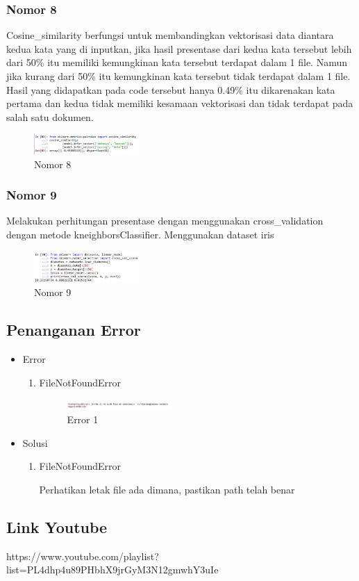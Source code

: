 \subsubsection{Nomor 8}
\hfill\break

Cosine\_similarity berfungsi untuk membandingkan vektorisasi data diantara kedua kata yang di inputkan, jika hasil presentase dari kedua kata tersebut lebih dari 50\% itu memiliki kemungkinan kata tersebut terdapat dalam 1 file. Namun jika kurang dari 50\% itu kemungkinan kata tersebut tidak terdapat dalam 1 file. Hasil yang didapatkan pada code tersebut hanya 0.49\% itu dikarenakan kata pertama dan kedua tidak memiliki kesamaan vektorisasi dan tidak terdapat pada salah satu dokumen.
\begin{figure}[H]
\includegraphics[width=4cm]{figures/1174067/5/hasil8.jpg}
\centering
\caption{Nomor 8}
\end{figure}

	
\subsubsection{Nomor 9}
\hfill\break

Melakukan perhitungan presentase dengan menggunakan cross\_validation dengan metode kneighborsClassifier. Menggunakan dataset iris
\begin{figure}[H]
\includegraphics[width=4cm]{figures/1174067/5/hasil9.jpg}
\centering
\caption{Nomor 9}
\end{figure}


\subsection{Penanganan Error}
\begin{itemize}
\item Error
\begin{enumerate}
\item FileNotFoundError
\begin{figure}[H]
\includegraphics[width=4cm]{figures/1174067/5/error1.jpg}
\centering
\caption{Error 1}
\end{figure}
\end{enumerate}
\item Solusi
\begin{enumerate}
\item FileNotFoundError

Perhatikan letak file ada dimana, pastikan path telah benar
\end{enumerate}
\end{itemize}

\subsection{Link Youtube}
https://www.youtube.com/playlist?list=PL4dhp4u89PHbhX9jrGyM3N12gmwhY3uIe